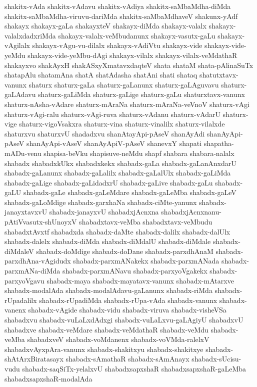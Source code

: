 {shakitx-vAda
shakitx-vAdavu
shakitx-vAdiya
shakitx-saMbaMdha-diMda
shakitx-saMbaMdha-viruvu-dariMda
shakitx-saMbaMdhaveV
shakunx-yAdf
shakayx
shakayx-gaLa
shakayxteV
shakayx-diMda
shakayx-valalx
shakayx-valalxdadxriMda
shakayx-valalx-veMbudanunx
shakayx-vasutx-gaLu
shakayx-vAgilalx
shakayx-vAgu-vu-dilalx
shakayx-vAdiVtu
shakayx-vide
shakayx-vide-yeMdu
shakayx-vide-yeMbu-dAgi
shakayx-vilalx
shakayx-vilalx-veMdathaR
shakayxvo
shakAyxH
shakASxyXmatavxdaqteV
shata
shataM
shata-pAlinaSuTx
shatapAlu
shatamAna
shatA
shatAdasha
shatAni
shati
shataq
shatutxtavx-vanunx
shaturx
shaturx-gaLa
shaturx-gaLanunx
shaturx-gaLAguvavu
shaturx-gaLAdavu
shaturx-gaLiMda
shaturx-gaLige
shaturx-gaLu
shaturxtavx-vanunx
shaturx-nAsha-vAdare
shaturx-mAraNa
shaturx-mAraNa-veVnoV
shaturx-vAgi
shaturx-vAgi-ralu
shaturx-vAgi-ruva
shaturx-vAdanu
shaturx-vAdarU
shaturx-vige
shaturx-vigoVsakxra
shaturx-vina
shaturx-vinalilx
shaturx-vilalxde
shaturxvu
shaturxvU
shadadxvu
shanAtayApi-pAseV
shanAyAdi
shanAyApi-pAseV
shanAyApi-vAseV
shanAyApiV-pAseV
shanevxY
shapati
shapatha-mADu-venu
shapisa-beVku
shapisuve-neMdu
shapf
shabara
shabara-nalalx
shabadx
shabadxkUkx
shabadxkekx
shabadx-gaLa
shabadx-gaLanAnxdarU
shabadx-gaLanunx
shabadx-gaLalilx
shabadx-gaLalUlx
shabadx-gaLiMda
shabadx-gaLige
shabadx-gaLidadxrU
shabadx-gaLive
shabadx-gaLu
shabadx-gaLU
shabadx-gaLe
shabadx-gaLeMdare
shabadx-gaLeMba
shabadx-gaLeV
shabadx-gaLoMdige
shabadx-garxhaNa
shabadx-ciMte-yanunx
shabadx-janayxtavxvU
shabadx-janayxvU
shabadxjAcnxna
shabadxjAcnxnanu-pAtiVvasutx-shUnoyxV
shabadxtavx-veMba
shabadxtavx-veMbudu
shabadxtAvxtf
shabadxda
shabadx-daMte
shabadx-dalilx
shabadx-dalUlx
shabadx-dalelx
shabadx-diMda
shabadx-diMdalU
shabadx-diMdale
shabadx-diMdaleV
shabadx-doMdige
shabadx-doDane
shabadx-parxdhAnaM
shabadx-parxdhAna-vAgidudx
shabadx-parxmANakekx
shabadx-parxmANada
shabadx-parxmANa-diMda
shabadx-parxmANavu
shabadx-parxyoVgakekx
shabadx-parxyoVgavu
shabadx-maya
shabadx-mayatavx-vanunx
shabadx-mAtarxve
shabadx-modalAda
shabadx-modalAdavu-gaLanunx
shabadx-riMda
shabadx-rUpadalilx
shabadx-rUpadiMda
shabadx-rUpa-vAda
shabadx-vanunx
shabadx-vanenx
shabadx-vAgide
shabadx-vidu
shabadx-viruva
shabadx-visheVSa
shabadxvu
shabadx-vuLaLxdAdxgi
shabadx-vuLaLxvu-gaLAgiyU
shabadxvU
shabadxve
shabadx-veMdare
shabadx-veMdathaR
shabadx-veMdu
shabadx-veMba
shabadxveV
shabadx-voMdanenx
shabadx-voVMda-ralelxV
shabadxvAyxpAra-vanunx
shabadx-shakitxyu
shabadx-shakitxye
shabadx-shAtArxBiratasayx
shabadx-sAmathaR
shabadx-sAmAnayx
shabadx-sUcisu-vudu
shabadx-saqSiTx-yelalxvU
shabadxsapxshaR
shabadxsapxshaR-gaLeMba
shabadxsapxshaR-modalAda
}
